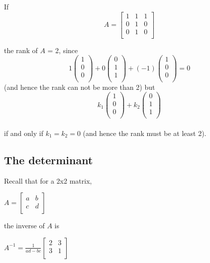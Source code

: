 \documentclass[12pt,a4paper]{article}
\theoremstyle{regla}
\theoremstyle{remark}
\theoremstyle{definition}
\theoremstyle{nonumberbreak}
\begin{document}
\begin{xmpl}

 If \[ A = 
  \left[ 
   \begin{array}{ccc}
     1 & 1 & 1 \\
     0 & 1 & 0 \\
     0 & 1 & 0 \\
   \end{array}
  \right]\]

the rank of  $A$ = 2,
since  
\[  1
  \left(
   \begin{array}{ccc}
     1 \\
     0 \\
     0 \\
   \end{array}
  \right) +  0
  \left(
   \begin{array}{ccc}
     0 \\
     1 \\
     1 \\
   \end{array}
  \right) + (-1)
  \left(
    \begin{array}{ccc}
      1 \\
      0 \\
      0 \\
    \end{array}
   \right) = 0 \] 
(and hence the rank can not be more than 2) 
but  
\[  k_1
  \left(
   \begin{array}{ccc}
     1 \\
     0 \\
     0 \\
   \end{array}
  \right) +  k_2
  \left(
   \begin{array}{ccc}
     0 \\
     1 \\
     1 \\
   \end{array}
  \right)\] \\ if and only if $k_1=k_2=0$ (and hence the rank must be at least 2).
\end{xmpl}

\subsection{The determinant}
\begin{fbox}
\begin{minipage}{0.97\textwidth}
Recall that for a 2x2 matrix, 

$A=
\begin{bmatrix}
a & b  \\
c & d  \\
\end{bmatrix}$

the inverse of $A$ is 

$A^{-1}=
\frac{1}{ad-bc}
\begin{bmatrix}
2 & 3  \\
3 & 1  \\
\end{bmatrix}$
\end{minipage}
\end{fbox}
\end{document}
